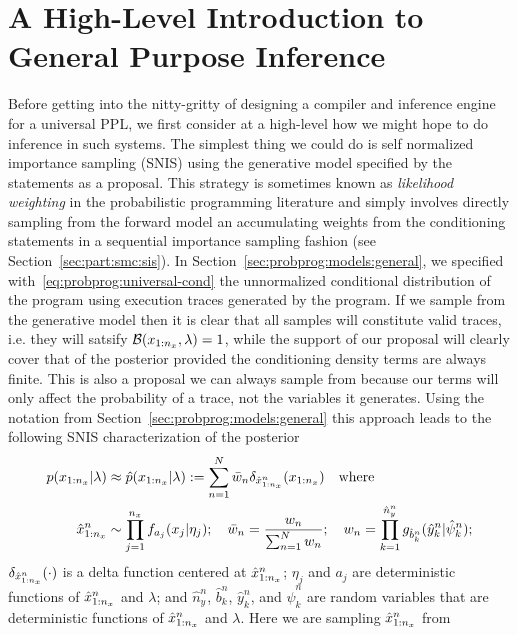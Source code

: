 
\section{A High-Level Introduction to General Purpose Inference}
\label{sec:proginf:high}

Before getting into the nitty-gritty of designing a compiler and inference engine for a universal PPL, we
first consider at a high-level how we might hope to do inference in such systems.  The simplest
thing we could do is self normalized importance sampling (SNIS) using the generative model specified by the \sample
statements as a proposal.  This strategy is sometimes known as \emph{likelihood weighting} in the probabilistic
programming literature and simply involves directly sampling from the forward model an accumulating
weights from the \observe conditioning statements in a sequential importance sampling fashion (see 
Section~\ref{sec:part:smc:sis}).
In Section~\ref{sec:probprog:models:general}, we specified with~\eqref{eq:probprog:universal-cond}
the unnormalized conditional distribution of the program using execution traces generated
by the program.  If we sample from the generative model then it is clear that all samples will constitute valid
traces, i.e. they will satsify
$\mathcal{B}(x_{1:n_x},\lambda)=1$, while  the support of our proposal will clearly cover that of
the posterior provided the conditioning density terms are always finite.  This is also a proposal
we can always sample from because our \observe terms will only affect the probability of a trace, not
the variables it generates.  Using the notation from Section~\ref{sec:probprog:models:general} 
this approach leads to the following SNIS characterization of the posterior
\begin{align}
p(x_{1:n_x} | \lambda) &\approx \hat{p}(x_{1:n_x} | \lambda) := \sum_{n=1}^{N} \bar w_n \delta_{\hat{x}_{1:n_x}^n} (x_{1:n_x})
\quad \text{where}  \\
\hat{x}_{1:n_x}^n &\sim \prod_{j=1}^{n_x} f_{a_j}(x_j | \eta_j); \quad \bar w_n = \frac{w_n}{\sum_{n=1}^{N} w_n}; \quad
w_n = \prod_{k=1}^{\hat{n}_{y}^n} g_{\hat{b}_{k}^n}(\hat{y}_{k}^n | \hat{\psi}_{k}^n);
\end{align}
$\delta_{\hat{x}_{1:n_x}^n} (\cdot)$ is a delta function centered at $\hat{x}_{1:n_x}^n$; $\eta_j$ and $a_j$ are deterministic functions of $\hat{x}_{1:n_x}^n$ 
and $\lambda$; and $\hat{n}_{y}^n$, $\hat{b}_{k}^n$, $\hat{y}_{k}^n$, and $\hat{\psi}_{k}^n$ are random variables
that are deterministic functions of $\hat{x}_{1:n_x}^n$ and $\lambda$.  Here we are sampling $\hat{x}_{1:n_x}^n$ from
